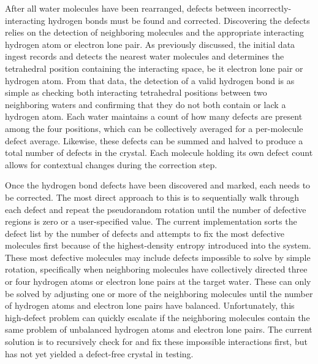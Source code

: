 After all water molecules have been rearranged, defects between incorrectly-interacting hydrogen bonds must be found and corrected.
Discovering the defects relies on the detection of neighboring molecules and the appropriate interacting hydrogen atom or electron lone pair. 
As previously discussed, the initial data ingest records and detects the nearest water molecules and determines the tetrahedral position containing the interacting space, be it electron lone pair or hydrogen atom. 
From that data, the detection of a valid hydrogen bond is as simple as checking both interacting tetrahedral positions between two neighboring waters and confirming that they do not both contain or lack a hydrogen atom.
Each water maintains a count of how many defects are present among the four positions, which can be collectively averaged for a per-molecule defect average.
Likewise, these defects can be summed and halved to produce a total number of defects in the crystal. 
Each molecule holding its own defect count allows for contextual changes during the correction step.



Once the hydrogen bond defects have been discovered and marked, each needs to be corrected.
The most direct approach to this is to sequentially walk through each defect and repeat the pseudorandom rotation until the number of defective regions is zero or a user-specified value.
The current implementation sorts the defect list by the number of defects and attempts to fix the most defective molecules first because of the highest-density entropy introduced into the system.
These most defective molecules may include defects impossible to solve by simple rotation, specifically when neighboring molecules have collectively directed three or four hydrogen atoms or electron lone pairs at the target water. 
These can only be solved by adjusting one or more of the neighboring molecules until the number of hydrogen atoms and electron lone pairs have balanced.
Unfortunately, this high-defect problem can quickly escalate if the neighboring molecules contain the same problem of unbalanced hydrogen atoms and electron lone pairs. 
The current solution is to recursively check for and fix these impossible interactions first, but has not yet yielded a defect-free crystal in testing.

